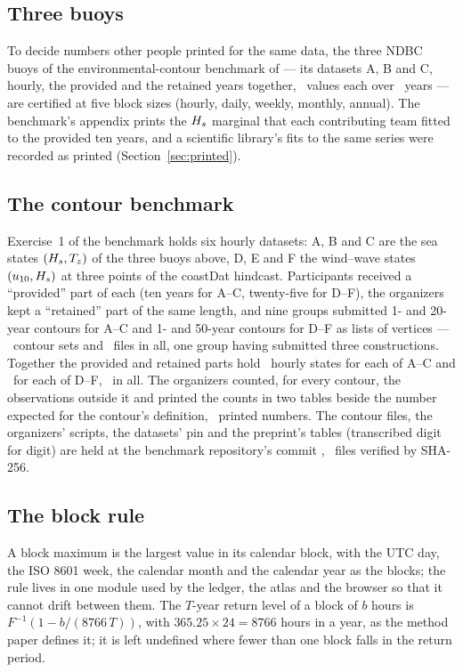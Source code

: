 \documentclass[preprint,11pt,authoryear]{elsarticle}
\begin{document}
\subsection{Three buoys}
To decide numbers other people printed for the same data, the three NDBC buoys of the environmental-contour benchmark of \citet{haselsteiner2021} --- its datasets A, B and C, hourly, the provided and the retained years together, \RBuoyN\ values each over \RBuoyYears\ years --- are certified at five block sizes (hourly, daily, weekly, monthly, annual). The benchmark's appendix prints the $H_s$ marginal that each contributing team fitted to the provided ten years, and a scientific library's fits to the same series were recorded as printed (Section~\ref{sec:printed}).

\subsection{The contour benchmark}\label{sec:ecdata}
Exercise~1 of the benchmark \citep{haselsteiner2021} holds six hourly datasets: A, B and C are the sea states $(H_s, T_z)$ of the three buoys above, D, E and F the wind--wave states $(u_{10}, H_s)$ at three points of the coastDat hindcast. Participants received a ``provided'' part of each (ten years for A--C, twenty-five for D--F), the organizers kept a ``retained'' part of the same length, and nine groups submitted 1- and 20-year contours for A--C and 1- and 50-year contours for D--F as lists of vertices --- \EContributions\ contour sets and \EContours\ files in all, one group having submitted three constructions. Together the provided and retained parts hold \EHoursABC\ hourly states for each of A--C and \EHoursDEF\ for each of D--F, \EHoursTotal\ in all. The organizers counted, for every contour, the observations outside it and printed the counts in two tables beside the number expected for the contour's definition, \EComparisons\ printed numbers. The contour files, the organizers' scripts, the datasets' pin and the preprint's tables (transcribed digit for digit) are held at the benchmark repository's commit \texttt{\ECommit}, \ECorpusFiles\ files verified by SHA-256.

\subsection{The block rule}
A block maximum is the largest value in its calendar block, with the UTC day, the ISO 8601 week, the calendar month and the calendar year as the blocks; the rule lives in one module used by the ledger, the atlas and the browser so that it cannot drift between them. The $T$-year return level of a block of $b$ hours is $F^{-1}(1 - b/(8766\,T))$, with $365.25 \times 24 = 8766$ hours in a year, as the method paper defines it; it is left undefined where fewer than one block falls in the return period.
\end{document}

